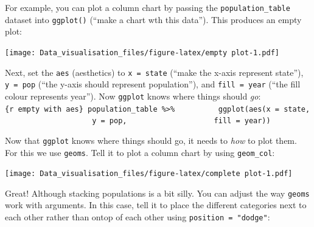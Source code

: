 \documentclass[]{book}
\newenvironment{Shaded}{\begin{snugshade}}{\end{snugshade}}
\newcommand{\DataTypeTok}[1]{\textcolor[rgb]{0.13,0.29,0.53}{#1}}
\newcommand{\KeywordTok}[1]{\textcolor[rgb]{0.13,0.29,0.53}{\textbf{#1}}}
\newcommand{\NormalTok}[1]{#1}
\newcommand{\OperatorTok}[1]{\textcolor[rgb]{0.81,0.36,0.00}{\textbf{#1}}}
\newcommand{\StringTok}[1]{\textcolor[rgb]{0.31,0.60,0.02}{#1}}
\begin{document}
For example, you can plot a column chart by passing the \texttt{population\_table} dataset into \texttt{ggplot()} (``make a chart wth this data''). This produces an empty plot:

\begin{Shaded}
\end{Shaded}

\texttt{[image: Data\_visualisation\_files/figure-latex/empty plot-1.pdf]}

Next, set the \texttt{aes} (aesthetics) to \texttt{x\ =\ state} (``make the x-axis represent state''), \texttt{y\ =\ pop} (``the y-axis should represent population''), and \texttt{fill\ =\ year} (``the fill colour represents year''). Now \texttt{ggplot} knows where things should \emph{go}:\texttt{\{r\ empty\ with\ aes\}\ population\_table\ \%\textgreater{}\%\ \ \ \ \ \ \ \ \ \ ggplot(aes(x\ =\ state,\ \ \ \ \ \ \ \ \ \ \ \ \ \ \ \ \ \ \ \ y\ =\ pop,\ \ \ \ \ \ \ \ \ \ \ \ \ \ \ \ \ \ \ \ fill\ =\ year))}

Now that \texttt{ggplot} knows where things should go, it needs to \emph{how} to plot them. For this we use \texttt{geoms}. Tell it to plot a column chart by using \texttt{geom\_col}:

\begin{Shaded}
\end{Shaded}

\texttt{[image: Data\_visualisation\_files/figure-latex/complete plot-1.pdf]}

Great! Although stacking populations is a bit silly. You can adjust the way \texttt{geoms} work with arguments. In this case, tell it to place the different categories next to each other rather than ontop of each other using \texttt{position\ =\ "dodge"}:

\begin{Shaded}
\end{Shaded}
\end{document}
